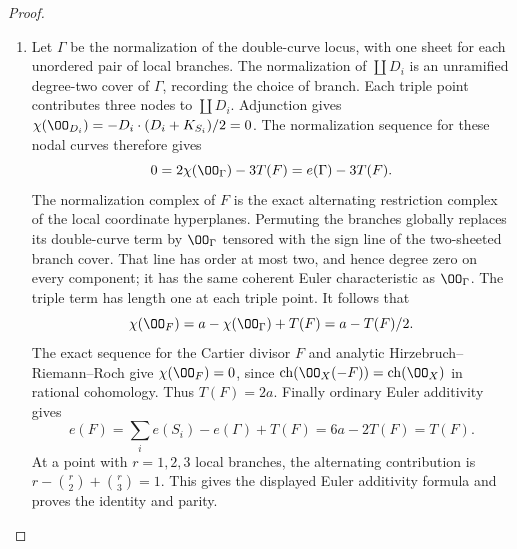 \begin{proof}
\begin{enumerate}[label={$\langle1\rangle$\arabic*.},leftmargin=*]
\item Let $\Gamma$ be the normalization of the double-curve locus, with one
sheet for each unordered pair of local branches. The normalization of
$\coprod D_i$ is an unramified degree-two cover of $\Gamma$, recording
the choice of branch. Each triple point contributes three nodes to
$\coprod D_i$. Adjunction gives
$\chi(\OO_{D_i})=-D_i\cdot(D_i+K_{S_i})/2=0$. The normalization
sequence for these nodal curves therefore gives
\[
 0=2\chi(\OO_\Gamma)-3T(F)=e(\Gamma)-3T(F).
\]
The normalization complex of $F$ is the exact alternating restriction
complex of the local coordinate hyperplanes. Permuting the branches
globally replaces its double-curve term by $\OO_\Gamma$ tensored with
the sign line of the two-sheeted branch cover. That line has order at
most two, and hence degree zero on every component; it has the same
coherent Euler characteristic as $\OO_\Gamma$. The triple term has
length one at each triple point. It follows that
\[
 \chi(\OO_F)=a-\chi(\OO_\Gamma)+T(F)=a-T(F)/2.
\]
The exact sequence for the Cartier divisor $F$ and analytic
Hirzebruch--Riemann--Roch give $\chi(\OO_F)=0$, since
$\operatorname{ch}(\OO_X(-F))=\operatorname{ch}(\OO_X)$ in rational
cohomology. Thus $T(F)=2a$. Finally ordinary Euler additivity gives
\[
 e(F)=\sum_i e(S_i)-e(\Gamma)+T(F)=6a-2T(F)=T(F).
\]
At a point with $r=1,2,3$ local branches, the alternating
contribution is $r-\binom r2+\binom r3=1$. This gives the
displayed Euler additivity formula and proves the identity and parity.

\end{enumerate}
\end{proof}